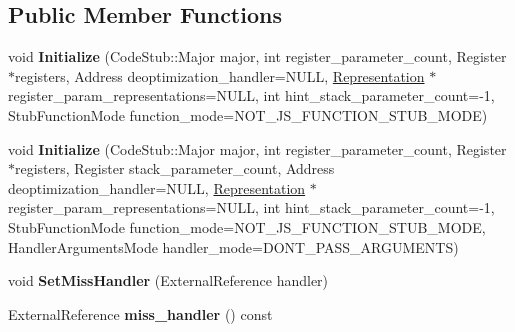 \subsection*{Public Member Functions}
\begin{DoxyCompactItemize}
\item 
\hypertarget{classv8_1_1internal_1_1_code_stub_interface_descriptor_acdbad76e82c81f97c34d60ee9f524932}{}void {\bfseries Initialize} (Code\+Stub\+::\+Major major, int register\+\_\+parameter\+\_\+count, Register $\ast$registers, Address deoptimization\+\_\+handler=N\+U\+L\+L, \hyperlink{classv8_1_1internal_1_1_representation}{Representation} $\ast$register\+\_\+param\+\_\+representations=N\+U\+L\+L, int hint\+\_\+stack\+\_\+parameter\+\_\+count=-\/1, Stub\+Function\+Mode function\+\_\+mode=N\+O\+T\+\_\+\+J\+S\+\_\+\+F\+U\+N\+C\+T\+I\+O\+N\+\_\+\+S\+T\+U\+B\+\_\+\+M\+O\+D\+E)\label{classv8_1_1internal_1_1_code_stub_interface_descriptor_acdbad76e82c81f97c34d60ee9f524932}

\item 
\hypertarget{classv8_1_1internal_1_1_code_stub_interface_descriptor_ad1d413a4ac753bcf417d583632cc2f86}{}void {\bfseries Initialize} (Code\+Stub\+::\+Major major, int register\+\_\+parameter\+\_\+count, Register $\ast$registers, Register stack\+\_\+parameter\+\_\+count, Address deoptimization\+\_\+handler=N\+U\+L\+L, \hyperlink{classv8_1_1internal_1_1_representation}{Representation} $\ast$register\+\_\+param\+\_\+representations=N\+U\+L\+L, int hint\+\_\+stack\+\_\+parameter\+\_\+count=-\/1, Stub\+Function\+Mode function\+\_\+mode=N\+O\+T\+\_\+\+J\+S\+\_\+\+F\+U\+N\+C\+T\+I\+O\+N\+\_\+\+S\+T\+U\+B\+\_\+\+M\+O\+D\+E, Handler\+Arguments\+Mode handler\+\_\+mode=D\+O\+N\+T\+\_\+\+P\+A\+S\+S\+\_\+\+A\+R\+G\+U\+M\+E\+N\+T\+S)\label{classv8_1_1internal_1_1_code_stub_interface_descriptor_ad1d413a4ac753bcf417d583632cc2f86}

\item 
\hypertarget{classv8_1_1internal_1_1_code_stub_interface_descriptor_a616c925bf4a1109766f9c443b3a96afc}{}void {\bfseries Set\+Miss\+Handler} (External\+Reference handler)\label{classv8_1_1internal_1_1_code_stub_interface_descriptor_a616c925bf4a1109766f9c443b3a96afc}

\item 
\hypertarget{classv8_1_1internal_1_1_code_stub_interface_descriptor_a1583dd5e8e41abc9e36174571095f823}{}External\+Reference {\bfseries miss\+\_\+handler} () const \label{classv8_1_1internal_1_1_code_stub_interface_descriptor_a1583dd5e8e41abc9e36174571095f823}


\end{DoxyCompactItemize}
